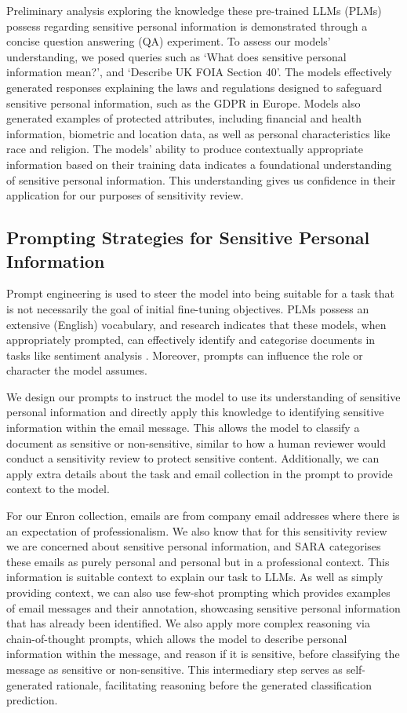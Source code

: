 Preliminary analysis exploring the knowledge these pre-trained LLMs (PLMs) possess regarding sensitive personal information is demonstrated through a concise question answering (QA) experiment. To assess our models’ understanding, we posed queries such as ‘What does sensitive personal information mean?’, and ‘Describe UK FOIA Section 40’. The models effectively generated responses explaining the laws and regulations designed to safeguard sensitive personal information, such as the GDPR in Europe. Models also generated examples of protected attributes, including financial and health information, biometric and location data, as well as personal characteristics like race and religion. The models' ability to produce contextually appropriate information based on their training data indicates a foundational understanding of sensitive personal information. This understanding gives us confidence in their application for our purposes of sensitivity review.

\subsection{Prompting Strategies for Sensitive Personal Information}
Prompt engineering is used to steer the model into being suitable for a task that is not necessarily the goal of initial fine-tuning objectives. PLMs possess an extensive (English) vocabulary, and research indicates that these models, when appropriately prompted, can effectively identify and categorise documents in tasks like sentiment analysis \cite{kocon2023chatgpt, krugmann2024sentiment}. Moreover, prompts can influence the role or character the model assumes.

We design our prompts to instruct the model to use its understanding of sensitive personal information and directly apply this knowledge to identifying sensitive information within the email message. This allows the model to classify a document as sensitive or non-sensitive, similar to how a human reviewer would conduct a sensitivity review to protect sensitive content. Additionally, we can apply extra details about the task and email collection in the prompt to provide context to the model.

For our Enron collection, emails are from company email addresses where there is an expectation of professionalism. We also know that for this sensitivity review we are concerned about sensitive personal information, and SARA categorises these emails as purely personal and personal but in a professional context. This information is suitable context to explain our task to LLMs. As well as simply providing context, we can also use few-shot prompting which provides examples of email messages and their annotation, showcasing sensitive personal information that has already been identified. We also apply more complex reasoning via chain-of-thought prompts, which allows the model to describe personal information within the message, and reason if it is sensitive, before classifying the message as sensitive or non-sensitive. This intermediary step serves as self-generated rationale, facilitating reasoning before the generated classification prediction.
